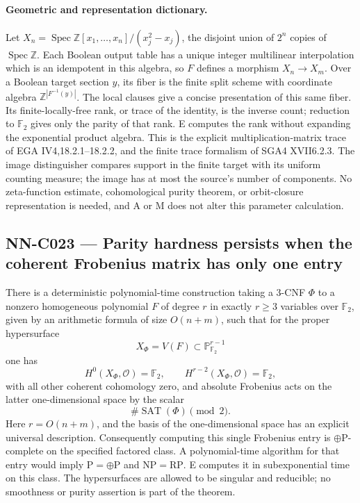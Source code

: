 \paragraph{Geometric and representation dictionary.}
Let $X_n=\operatorname{Spec}\mathbb Z[x_1,\ldots,x_n]/(x_j^2-x_j)$, the disjoint union of $2^n$ copies of $\operatorname{Spec}\mathbb Z$. Each Boolean output table has a unique integer multilinear interpolation which is an idempotent in this algebra, so $F$ defines a morphism $X_n\to X_m$. Over a Boolean target section $y$, its fiber is the finite split scheme with coordinate algebra $\mathbb Z^{|F^{-1}(y)|}$. The local clauses give a concise presentation of this same fiber. Its finite-locally-free rank, or trace of the identity, is the inverse count; reduction to $\mathbb F_2$ gives only the parity of that rank. E computes the rank without expanding the exponential product algebra. This is the explicit multiplication-matrix trace of EGA IV4,18.2.1--18.2.2, and the finite trace formalism of SGA4 XVII6.2.3. The image distinguisher compares support in the finite target with its uniform counting measure; the image has at most the source's number of components. No zeta-function estimate, cohomological purity theorem, or orbit-closure representation is needed, and A or M does not alter this parameter calculation.

\subsection{NN-C023 --- Parity hardness persists when the coherent Frobenius matrix has only one entry}
\begin{proposition}[NN-C023]
There is a deterministic polynomial-time construction taking a 3-CNF $\Phi$ to a nonzero homogeneous polynomial $F$ of degree $r$ in exactly $r\geq3$ variables over $\mathbb F_2$, given by an arithmetic formula of size $O(n+m)$, such that for the proper hypersurface
\[
 X_\Phi=V(F)\subset\mathbb P^{r-1}_{\mathbb F_2}
\]
one has
\[
 H^0(X_\Phi,\mathcal O)=\mathbb F_2,\qquad
 H^{r-2}(X_\Phi,\mathcal O)=\mathbb F_2,
\]
with all other coherent cohomology zero, and absolute Frobenius acts on the latter one-dimensional space by the scalar
\[
 \#\operatorname{SAT}(\Phi)\pmod2.
\]
Here $r=O(n+m)$, and the basis of the one-dimensional space has an explicit universal description. Consequently computing this single Frobenius entry is $\oplus\mathrm P$-complete on the specified factored class. A polynomial-time algorithm for that entry would imply $\mathrm P=\oplus\mathrm P$ and $\mathrm{NP}=\mathrm{RP}$. E computes it in subexponential time on this class. The hypersurfaces are allowed to be singular and reducible; no smoothness or purity assertion is part of the theorem.
\end{proposition}
